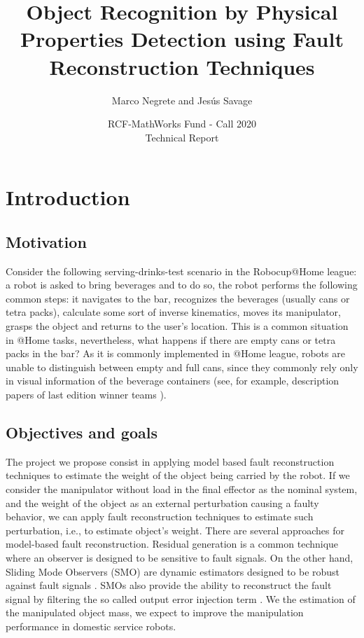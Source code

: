 \documentclass[a4paper, 10pt]{article}
\title{Object Recognition by Physical Properties Detection using Fault Reconstruction Techniques}
\author{Marco Negrete and Jesús Savage}
\date{RCF-MathWorks Fund - Call 2020\\Technical Report}
\begin{document}
\maketitle

\section{Introduction}
\thispagestyle{mypagestyle}
\subsection{Motivation}
Consider the following serving-drinks-test scenario in the Robocup@Home league: a robot is asked to bring beverages and to do so, the robot performs the following common steps: it navigates to the bar, recognizes the beverages (usually cans or tetra packs), calculate some sort of inverse kinematics, moves its manipulator, grasps the object and returns to the user's location. This is a common situation in @Home tasks, nevertheless, what happens if there are empty cans or tetra packs in the bar? As it is commonly implemented in @Home league, robots are unable to distinguish between empty and full cans, since they commonly rely only in visual information of the beverage containers (see, for example, description papers of last edition winner teams \cite{tdp2019Eindhoven, tdp2019Homer, tdp2019UTS}).
\subsection{Objectives and goals}
The project we propose consist in applying model based fault reconstruction techniques \cite{ding2013model} to estimate the weight of the object being carried by the robot. If we consider the manipulator without load in the final effector as the nominal system, and the weight of the object as an external perturbation causing a faulty behavior, we can apply fault reconstruction techniques to estimate such perturbation, i.e., to estimate object's weight. There are several approaches for model-based fault reconstruction. Residual generation is a common technique where an observer is designed to be sensitive to fault signals. On the other hand, Sliding Mode Observers (SMO) are dynamic estimators designed to be robust against fault signals \cite{shtessel2014sliding}. SMOs also provide the ability to reconstruct the fault signal by filtering the so called output error injection term \cite{alwi2011fault}. We the estimation of the manipulated object mass, we expect to improve the manipulation performance in domestic service robots. 
\end{document}
